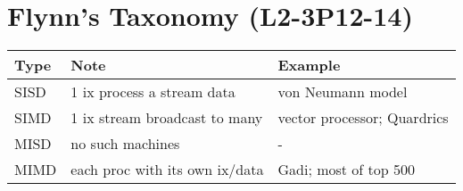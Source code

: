 \section*{Flynn's Taxonomy (\textbf{L2-3P12-14})}
\begin{tabular}{l|p{4cm}l}
  \hline
  Type & Note & Example \\
  \hline
  SISD & 1 ix process a stream data  & von Neumann model \\
  SIMD & 1 ix stream broadcast to many & vector processor; Quardrics\\
  MISD & no such machines  & - \\
  MIMD & each proc with its own ix/data & Gadi; most of top 500 \\
  \hline
\end{tabular}
